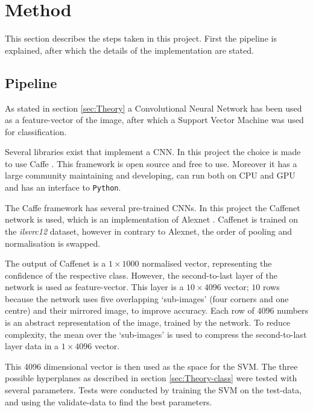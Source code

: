 \section{Method}
\label{sec:Method}
This section describes the steps taken in this project.
First the pipeline is explained, after which the details of the implementation are stated.

\subsection{Pipeline}
\label{sec:Method-pipeline}
As stated in section \ref{sec:Theory} a Convolutional Neural Network has been used as a feature-vector of the image, after which a Support Vector Machine was used for classification.

Several libraries exist that implement a CNN.
In this project the choice is made to use Caffe \citep{jia2014caffe}.
This framework is open source and free to use.
Moreover it has a large community maintaining and developing, can run both on CPU and GPU and has an interface to \texttt{Python}.

The Caffe framework has several pre-trained CNNs.
In this project the Caffenet network is used, which is an implementation of Alexnet \citep{krizhevsky2012imagenet}. Caffenet is trained on the \textit{ilsvrc12} dataset, however in contrary to Alexnet, the order of pooling and normalisation is swapped. \citeneed

The output of Caffenet is a $1\times1000$ normalised vector, representing the confidence of the respective class.
However, the second-to-last layer of the network is used as feature-vector. This layer is a $10\times4096$ vector; $10$ rows because the network uses five overlapping `sub-images' (four corners and one centre) and their mirrored image, to improve accuracy.
Each row of $4096$ numbers is an abstract representation of the image, trained by the network.
To reduce complexity, the mean over the `sub-images' is used to compress the second-to-last layer data in a $1\times4096$ vector.

This 4096 dimensional vector is then used as the space for the SVM.
The three possible hyperplanes as described in section \ref{sec:Theory-class} were tested with several parameters.
Tests were conducted by training the SVM on the test-data, and using the validate-data to find the best parameters.

